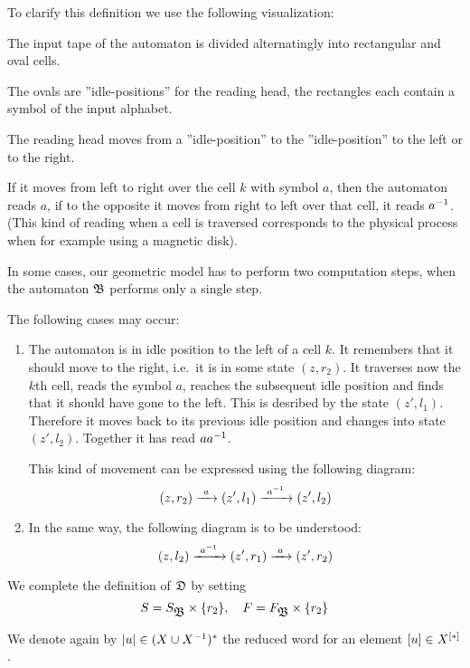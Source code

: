 \bigskip
To clarify this definition we use the following visualization:

The input tape of the automaton is divided alternatingly into rectangular and
oval cells.

\begin{center}

\end{center}

The ovals are ''idle-positions'' for the reading head, the rectangles
each contain a symbol of the input alphabet.

The reading head moves from a ''idle-position'' to the ''idle-position'' to the
left or to the right.

If it moves from left to right over the cell $k$ with symbol $a$, then the
automaton reads $a$, if to the opposite it moves from right to left over that
cell, it reads ${{a}^{-1}}$. (This kind of reading when a cell is traversed
corresponds to the physical process when for example using a magnetic disk).

In some cases, our geometric model has to perform two computation steps, when
the automaton $\mbox{$\mathfrak{B}$}$ performs only a single step.

The following cases may occur:

\begin{enumerate}
  \item The automaton is in idle position to the left of a cell $k$. It
  remembers that it should move to the right, i.e.\ it is in some state $(z,
  r_2)$. It traverses now the $k$th cell, reads the symbol $a$, reaches the
  subsequent idle position and finds that it should have gone to the left. This
  is desribed by the state $(z', l_1)$. Therefore it moves back to its previous
  idle position and changes into state $(z', l_2)$. Together it has read $a
  {{a}^{-1}}$.
  
  This kind of movement can be expressed using the following diagram:
  \[ (z, r_2) \xrightarrow{\ {a}\ } (z', l_1) \xrightarrow{\ {{{a}^{-1}}}\ } (z', l_2) \]
  
  \item In the same way, the following diagram is to be understood:
  \[ (z, l_2) \xrightarrow{\ {{{a}^{-1}}}\ } (z', r_1) \xrightarrow{\ {a}\ } (z', r_2) \]
\end{enumerate}

We complete the definition of $\mbox{$\mathfrak{D}$}$ by setting
\[ S = S_{\mbox{$\mathfrak{B}$}} \times \mbox{$\{r_2\}$},\quad F = F_{\mbox{$\mathfrak{B}$}} \times \mbox{$\{r_2\}$} \]

We denote again by $|u| \in (X \cup {X}^{-1})^*$ the reduced word for an element
$[u] \in \mbox{${X}^{[*]}$}$.

